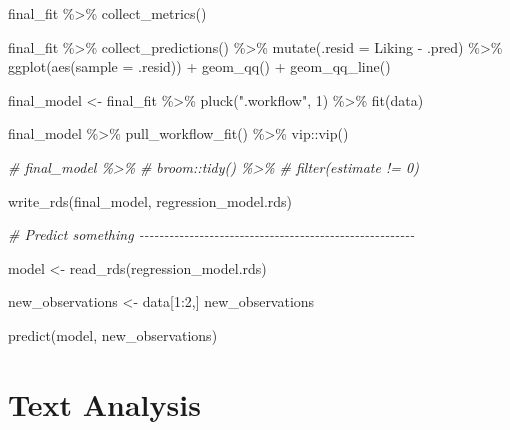 \documentclass[
]{book}
\newenvironment{Shaded}{\begin{snugshade}}{\end{snugshade}}
\newcommand{\AttributeTok}[1]{\textcolor[rgb]{0.77,0.63,0.00}{#1}}
\newcommand{\CommentTok}[1]{\textcolor[rgb]{0.56,0.35,0.01}{\textit{#1}}}
\newcommand{\DecValTok}[1]{\textcolor[rgb]{0.00,0.00,0.81}{#1}}
\newcommand{\FunctionTok}[1]{\textcolor[rgb]{0.00,0.00,0.00}{#1}}
\newcommand{\NormalTok}[1]{#1}
\newcommand{\OtherTok}[1]{\textcolor[rgb]{0.56,0.35,0.01}{#1}}
\newcommand{\SpecialCharTok}[1]{\textcolor[rgb]{0.00,0.00,0.00}{#1}}
\newcommand{\StringTok}[1]{\textcolor[rgb]{0.31,0.60,0.02}{#1}}
\begin{document}
\begin{Shaded}
\begin{Highlighting}[]
\NormalTok{final\_fit }\SpecialCharTok{\%\textgreater{}\%} \FunctionTok{collect\_metrics}\NormalTok{()}

\NormalTok{final\_fit }\SpecialCharTok{\%\textgreater{}\%}
  \FunctionTok{collect\_predictions}\NormalTok{() }\SpecialCharTok{\%\textgreater{}\%}
  \FunctionTok{mutate}\NormalTok{(}\AttributeTok{.resid =}\NormalTok{ Liking }\SpecialCharTok{{-}}\NormalTok{ .pred) }\SpecialCharTok{\%\textgreater{}\%}
  \FunctionTok{ggplot}\NormalTok{(}\FunctionTok{aes}\NormalTok{(}\AttributeTok{sample =}\NormalTok{ .resid)) }\SpecialCharTok{+}
  \FunctionTok{geom\_qq}\NormalTok{() }\SpecialCharTok{+}
  \FunctionTok{geom\_qq\_line}\NormalTok{()}

\NormalTok{final\_model }\OtherTok{\textless{}{-}}\NormalTok{  final\_fit }\SpecialCharTok{\%\textgreater{}\%}
  \FunctionTok{pluck}\NormalTok{(}\StringTok{".workflow"}\NormalTok{, }\DecValTok{1}\NormalTok{) }\SpecialCharTok{\%\textgreater{}\%}
  \FunctionTok{fit}\NormalTok{(data)}

\NormalTok{final\_model }\SpecialCharTok{\%\textgreater{}\%}
  \FunctionTok{pull\_workflow\_fit}\NormalTok{() }\SpecialCharTok{\%\textgreater{}\%}
\NormalTok{  vip}\SpecialCharTok{::}\FunctionTok{vip}\NormalTok{()}

\CommentTok{\# final\_model \%\textgreater{}\%}
\CommentTok{\#   broom::tidy() \%\textgreater{}\%}
\CommentTok{\#   filter(estimate != 0)}

\FunctionTok{write\_rds}\NormalTok{(final\_model, }\StringTok{\textquotesingle{}regression\_model.rds\textquotesingle{}}\NormalTok{)}

\CommentTok{\# Predict something {-}{-}{-}{-}{-}{-}{-}{-}{-}{-}{-}{-}{-}{-}{-}{-}{-}{-}{-}{-}{-}{-}{-}{-}{-}{-}{-}{-}{-}{-}{-}{-}{-}{-}{-}{-}{-}{-}{-}{-}{-}{-}{-}{-}{-}{-}{-}{-}{-}{-}{-}{-}{-}{-}{-}}

\NormalTok{model }\OtherTok{\textless{}{-}} \FunctionTok{read\_rds}\NormalTok{(}\StringTok{\textquotesingle{}regression\_model.rds\textquotesingle{}}\NormalTok{)}

\NormalTok{new\_observations }\OtherTok{\textless{}{-}}\NormalTok{ data[}\DecValTok{1}\SpecialCharTok{:}\DecValTok{2}\NormalTok{,]}
\NormalTok{new\_observations}

\FunctionTok{predict}\NormalTok{(model, new\_observations)}
\end{Highlighting}
\end{Shaded}

\hypertarget{text-analysis}{%
\chapter{Text Analysis}\label{text-analysis}}
\end{document}
